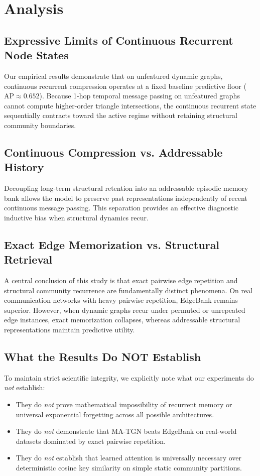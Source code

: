 \documentclass[10pt,twocolumn,letterpaper]{article}
\begin{document}
\section{Analysis}
\label{sec:analysis}

\subsection{Expressive Limits of Continuous Recurrent Node States}
Our empirical results demonstrate that on unfeatured dynamic graphs, continuous recurrent compression operates at a fixed baseline predictive floor ($\text{AP} \approx 0.652$). Because 1-hop temporal message passing on unfeatured graphs cannot compute higher-order triangle intersections, the continuous recurrent state sequentially contracts toward the active regime without retaining structural community boundaries.

\subsection{Continuous Compression vs. Addressable History}
Decoupling long-term structural retention into an addressable episodic memory bank allows the model to preserve past representations independently of recent continuous message passing. This separation provides an effective diagnostic inductive bias when structural dynamics recur.

\subsection{Exact Edge Memorization vs. Structural Retrieval}
A central conclusion of this study is that exact pairwise edge repetition and structural community recurrence are fundamentally distinct phenomena. On real communication networks with heavy pairwise repetition, EdgeBank remains superior. However, when dynamic graphs recur under permuted or unrepeated edge instances, exact memorization collapses, whereas addressable structural representations maintain predictive utility.

\subsection{What the Results Do NOT Establish}
To maintain strict scientific integrity, we explicitly note what our experiments do \textit{not} establish:
\begin{itemize}
    \item They do \textit{not} prove mathematical impossibility of recurrent memory or universal exponential forgetting across all possible architectures.
    \item They do \textit{not} demonstrate that MA-TGN beats EdgeBank on real-world datasets dominated by exact pairwise repetition.
    \item They do \textit{not} establish that learned attention is universally necessary over deterministic cosine key similarity on simple static community partitions.
\end{itemize}
\end{document}
